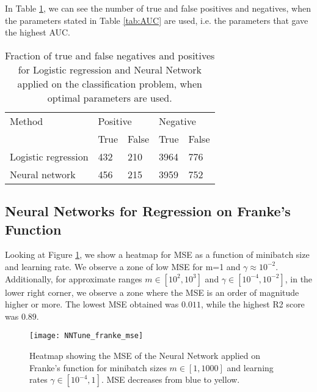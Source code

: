 In Table \ref{tab:confusion}, we can see the number of true and false positives and negatives, when the parameters stated in Table \ref{tab:AUC} are used, i.e. the parameters that gave the highest AUC.
\begin{table}[htbp]
	\centering
	\renewcommand{\arraystretch}{1.2}
	\caption{Fraction of true and false negatives and positives for Logistic regression and Neural Network applied on the classification problem, when optimal parameters are used.}
	\begin{tabular}{p{18mm} l l l l}
		\toprule
		Method & \multicolumn{2}{l}{Positive} & \multicolumn{2}{l}{Negative} \\
		\cline{2-3} \cline{4-5}
		& True & False & True & False \\
		\midrule
		Logistic \newline regression & 432 & 210 & 3964 & 776 \\
		Neural \newline network & 456 & 215 & 3959 & 752 \\
		\bottomrule
	\end{tabular}
	\label{tab:confusion}
\end{table}

\subsection{Neural Networks for Regression on Franke's Function}
Looking at Figure \ref{fig:TuneNN_mse}, we show a heatmap for MSE as a function of
minibatch size and learning rate. We observe a zone of low MSE for m=1 and $\gamma\approx 10^{-2}$.
Additionally, for approximate ranges $m\in[10^2, 10^3]$ and $\gamma\in[10^{-4}, 10^{-2}]$, in the lower right corner, we observe a zone where the MSE is an order of magnitude higher or more. The lowest MSE obtained was $0.011$, while the highest R2 score was $0.89$.
\begin{figure}[htbp]
	\centering
	\texttt{[image: NNTune\_franke\_mse]}
	\caption{Heatmap showing the MSE of the Neural Network applied on Franke's function for minibatch sizes $m\in[1, 1000]$ and learning rates $\gamma\in[10^{-4}, 1]$. MSE decreases from blue to yellow.}
	\label{fig:TuneNN_mse}
\end{figure}
